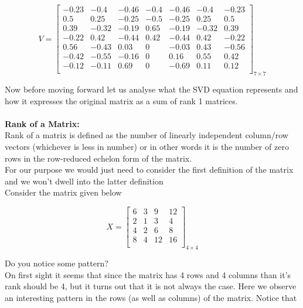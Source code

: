 \documentclass{article}
\begin{document}
\begin{equation*}
    V = \begin{bmatrix}
        -0.23 & -0.4 & -0.46 & -0.4 & -0.46 & -0.4 & -0.23 \\
        0.5 & 0.25 & -0.25 & -0.5 & -0.25 & 0.25 & 0.5 \\
        0.39 & -0.32 & -0.19 & 0.65 & -0.19 & -0.32 & 0.39 \\
        -0.22 & 0.42 & -0.44 & 0.42 & -0.44 & 0.42 & -0.22 \\
        0.56 & -0.43 & 0.03 & 0 & -0.03 & 0.43 & -0.56 \\
        -0.42 & -0.55 & -0.16 & 0 & 0.16 & 0.55 & 0.42 \\
        -0.12 & -0.11 & 0.69 & 0 & -0.69 & 0.11 & 0.12 \\
    \end{bmatrix}_{7\times7}
\end{equation*}

Now before moving forward let us analyse what the SVD equation represents and how it expresses the original matrix as a sum of rank 1 matrices.\\ \\

\textbf{Rank of a Matrix:} \\
Rank of a matrix is defined as the number of linearly independent column/row vectors (whichever is less in number) or in other words it is the number of zero rows in the row-reduced echelon form of the matrix. \\
For our purpose we would just need to consider the first definition of the matrix and we won't dwell into the latter definition \\
Consider the matrix given below

\begin{equation*}
    X = \begin{bmatrix}
        6 & 3 & 9 & 12 \\
        2 & 1 & 3 & 4 \\
        4 & 2 & 6 & 8 \\
        8 & 4 & 12 & 16 \\
    \end{bmatrix}_{4\times4}
\end{equation*}

Do you notice some pattern? \\
On first sight it seems that since the matrix has 4 rows and 4 columns than it's rank should be 4, but it turns out that it is not always the case. Here we observe an interesting pattern in the rows (as well as columns) of the matrix. Notice that
\end{document}
